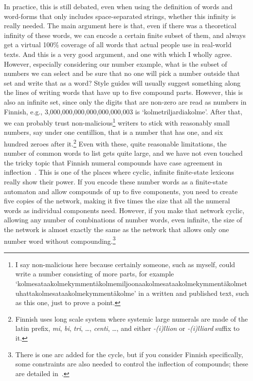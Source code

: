 \documentclass[officiallayout,final]{unihelcompling}
\begin{document}
In practice, this is still debated, even when using the definition of words and
word-forms that only includes space-separated strings, whether this infinity is
really needed. The main argument here is that, even if there was a theoretical
infinity of these words, we can encode a certain finite subset of them, and
always get a virtual 100\% coverage of all words that actual people use in
real-world texts. And this is a very good argument, and one with which I wholly
agree. However, especially considering our number example, what is the subset
of numbers we can select and be sure that no one will pick a number outside
that set and write that as a word? Style guides will usually suggest something
along the lines of writing words that have up to five compound parts.  However,
this is also an infinite set, since only the digits that are non-zero are read
as numbers in Finnish, e.g., 3,000,000,000,000,000,000,003 is
`kolmetriljardiakolme'. After that, we can probably trust
non-malicious\footnote{I say non-malicious here because certainly someone, such
    as myself, could write a number consisting of more parts, for example
    `kolmesataakolmekymmentäkolmemiljoonaakolmesataakolmekymmentäkolmetuhattakolmesataakolmekymmentäkolme'
in a written and published text, such as this one, just to prove a point.}
writers to stick with reasonably small numbers, say under one centillion, that
is a number that has one, and six hundred zeroes after it.\footnote{Finnish
    uses long scale system where systemic large numerals are made of the latin
    prefix, \emph{mi}, \emph{bi}, \emph{tri}, \ldots, \emph{centi}, \ldots, and
either \emph{-(i)llion} or \emph{-(i)lliard} suffix to it.} Even with these,
quite reasonable limitations, the number of common words to list gets quite
large, and we have not even touched the tricky topic that Finnish numeral
compounds have case agreement in inflection~\citep{karttunen2006numbers}. This
is one of the places where cyclic, infinite finite-state lexicons really show
their power.  If you encode these number words as a \gls{finite-state
automaton} and allow compounds of up to five components, you need to create
five copies of the network, making it five times the size that all the numeral
words as individual components need.  However, if you make that network cyclic,
allowing any number of combinations of number words, even infinite, the size of
the network is almost exactly the same as the network that allows only one
number word without compounding.\footnote{There is one arc added for the cycle,
but if you consider Finnish specifically, some constraints are also needed to
control the inflection of compounds; these are detailed
in~\citet{karttunen2006numbers}.}
\end{document}
